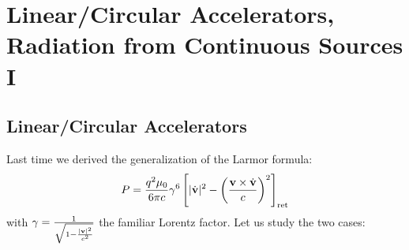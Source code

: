 \section{Linear/Circular Accelerators, Radiation from Continuous Sources I}

\subsection{Linear/Circular Accelerators}
Last time we derived the generalization of the Larmor formula:
\begin{equation}
    P = \frac{q^2\mu_0}{6\pi c}\gamma^6\left[\lvert \dot{\mathbf{v}} \rvert^2 - \left(\frac{\mathbf{v} \times \dot{\mathbf{v}}}{c}\right)^2\right]_{\text{ret}}
\end{equation}
with $\gamma = \frac{1}{\sqrt{1- \frac{\lvert \mathbf{v} \rvert^2}{c^2}}}$ the familiar Lorentz factor. Let us study the two cases:
